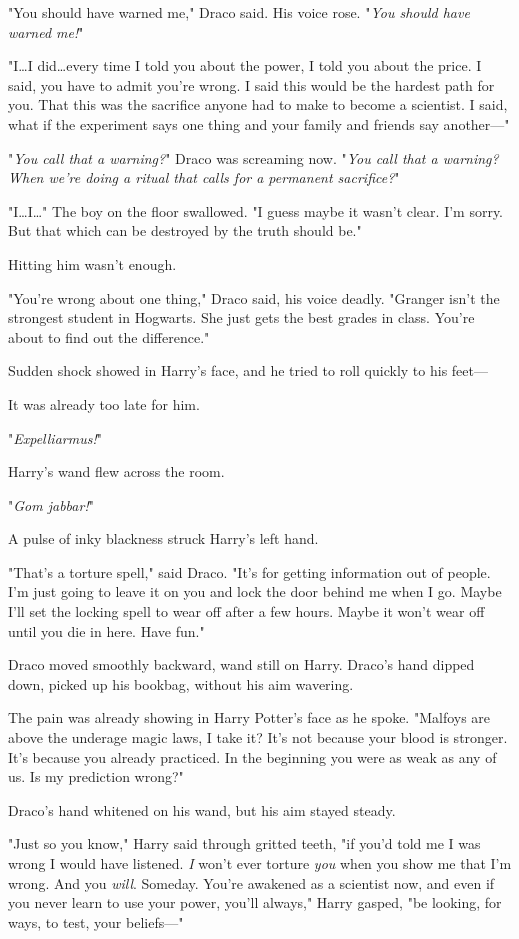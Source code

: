 "You should have warned me," Draco said. His voice rose. "\emph{You should have
warned me!}"

"I…I did…every time I told you about the power, I told you
about the price. I said, you have to admit you're wrong. I said this would be
the hardest path for you. That this was the sacrifice anyone had to make to
become a scientist. I said, what if the experiment says one thing and your
family and friends say another---"

"\emph{You call that a warning?}" Draco was screaming now. "\emph{You call that
a warning? When we're doing a ritual that calls for a permanent sacrifice?}"

"I…I…" The boy on the floor swallowed. "I guess maybe it wasn't
clear. I'm sorry. But that which can be destroyed by the truth should be."

Hitting him wasn't enough.

"You're wrong about one thing," Draco said, his voice deadly. "Granger isn't
the strongest student in Hogwarts. She just gets the best grades in class.
You're about to find out the difference."

Sudden shock showed in Harry's face, and he tried to roll quickly to his feet---

It was already too late for him.

"\emph{Expelliarmus!}"

Harry's wand flew across the room.

"\emph{Gom jabbar!}"

A pulse of inky blackness struck Harry's left hand.

"That's a torture spell," said Draco. "It's for getting information out of
people. I'm just going to leave it on you and lock the door behind me when I
go. Maybe I'll set the locking spell to wear off after a few hours. Maybe it
won't wear off until you die in here. Have fun."

Draco moved smoothly backward, wand still on Harry. Draco's hand dipped down,
picked up his bookbag, without his aim wavering.

The pain was already showing in Harry Potter's face as he spoke. "Malfoys are
above the underage magic laws, I take it? It's not because your blood is
stronger. It's because you already practiced. In the beginning you were as weak
as any of us. Is my prediction wrong?"

Draco's hand whitened on his wand, but his aim stayed steady.

"Just so you know," Harry said through gritted teeth, "if you'd told me I was
wrong I would have listened. \emph{I} won't ever torture \emph{you} when you
show me that I'm wrong. And you \emph{will}. Someday. You're awakened as a
scientist now, and even if you never learn to use your power, you'll always,"
Harry gasped, "be looking, for ways, to test, your beliefs---"


